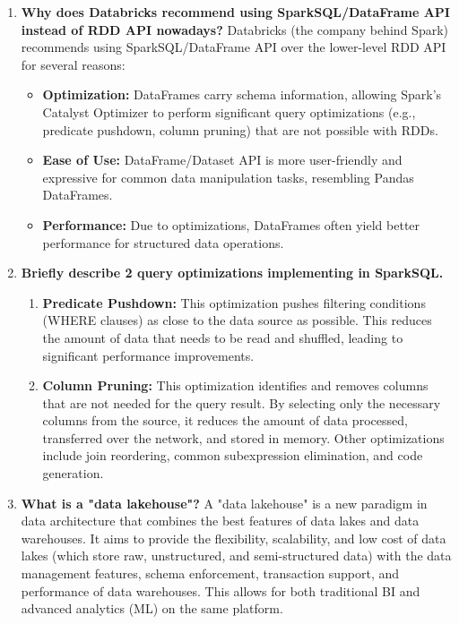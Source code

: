\documentclass{article}
\begin{document}
\begin{enumerate}
    \item \textbf{Why does Databricks recommend using SparkSQL/DataFrame API instead of RDD API nowadays?}
    Databricks (the company behind Spark) recommends using SparkSQL/DataFrame API over the lower-level RDD API for several reasons:
    \begin{itemize}
        \item \textbf{Optimization:} DataFrames carry schema information, allowing Spark's Catalyst Optimizer to perform significant query optimizations (e.g., predicate pushdown, column pruning) that are not possible with RDDs.
        \item \textbf{Ease of Use:} DataFrame/Dataset API is more user-friendly and expressive for common data manipulation tasks, resembling Pandas DataFrames.
        \item \textbf{Performance:} Due to optimizations, DataFrames often yield better performance for structured data operations.
    \end{itemize}

    \item \textbf{Briefly describe 2 query optimizations implementing in SparkSQL.}
    \begin{enumerate}[label=\alph*)]
        \item \textbf{Predicate Pushdown:} This optimization pushes filtering conditions (WHERE clauses) as close to the data source as possible. This reduces the amount of data that needs to be read and shuffled, leading to significant performance improvements.
        \item \textbf{Column Pruning:} This optimization identifies and removes columns that are not needed for the query result. By selecting only the necessary columns from the source, it reduces the amount of data processed, transferred over the network, and stored in memory.
        Other optimizations include join reordering, common subexpression elimination, and code generation.
    \end{enumerate}

    \item \textbf{What is a "data lakehouse"?}
    A "data lakehouse" is a new paradigm in data architecture that combines the best features of data lakes and data warehouses. It aims to provide the flexibility, scalability, and low cost of data lakes (which store raw, unstructured, and semi-structured data) with the data management features, schema enforcement, transaction support, and performance of data warehouses. This allows for both traditional BI and advanced analytics (ML) on the same platform.


\end{enumerate}
\end{document}
